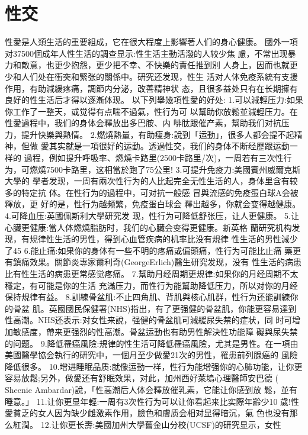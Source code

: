 \documentclass[12pt,UTF8]{ctexbook}
\begin{document}
\part{性交}

性愛是人類生活的重要組成，它在很大程度上影響著人们的身心健康。
國外一項对37500個成年人性生活的調查显示:性生活主動活潑的人较少焦
慮，不常出现暴力和敵意，也更少抱怨，更少把不幸、不快樂的責任推到別
人身上，因而也就更少和人们处在衝突和緊张的關係中。研究还发现，性生
活对人体免疫系統有支援作用，有助減緩疼痛，調節内分泌，改善精神状
态，且很多益处只有在长期擁有良好的性生活后才得以逐漸体现。
以下列舉幾項性愛的好处:
1.可以減輕压力:如果你工作了一整天，或觉得有点喘不過氣，性行为可
以幫助你放鬆並減輕压力。在性愛過程中，我们的身体会釋放出多巴胺、内
啡肽跟催产素，幫助我们对抗压力，提升快樂與熱情。
2.燃燒熱量，有助瘦身:說到「运動」，很多人都会提不起精神，但做
愛其实就是一項很好的运動。透過性交，我们的身体不断经歷跟运動一样的
過程，例如提升呼吸率、燃燒卡路里(2500卡路里/次)，一周若有三次性行
为，可燃燒7500卡路里，这相當於跑了75公里!
3.可提升免疫力:美國賓州威爾克斯大學的
學者发现，一周有兩次性行为的人比起完全无性生活的人，身体里含有较多的特定抗
体。在性行为的過程中，可对抗一般感
冒與流感的免疫蛋白球A会被釋放，更
好的是，性行为越频繁，免疫蛋白球会
釋出越多，你就会变得越健康。
4.可降血压:英國佩斯利大學研究发
现，性行为可降低舒张压，让人更健康。
5.让心臟更健康:當人体燃燒脂肪时，我们的心臟会变得更健康。新英格
蘭研究机构发现，有規律性生活的男性，得到心血管疾病的机率比没有規律
性生活的男性減少了45%
6.能止痛:如果你的身体有一些不明的疼痛或偏頭痛，性行为可能比止痛
藥更有鎮痛效果。關節炎專家爾利奇(GeorgeErlich)醫生研究发现，没有
性生活的病患比有性生活的病患更常感觉疼痛。
7.幫助月经周期更規律:如果你的月经周期不太穩定，有可能是你的生活
充滿压力，而性行为能幫助降低压力，所以对你的月经保持規律有益。
8.訓練骨盆肌:不止四角肌、背肌與核心肌群，性行为还能訓練你的骨盆
肌。英國國民保健署(NHS)指出，有了更强健的骨盆肌，你能更容易達到
性高潮。NHS还表示:对女性来說，强健的骨盆肌可減緩尿失禁的症状，同
时可增加敏感度，帶来更强烈的性高潮。骨盆运動也有助男性解決性功能障
礙與尿失禁的问题。
9.降低罹癌風險:規律的性生活可降低罹癌風險，尤其是男性。在一項由
美國醫學協会執行的研究中，一個月至少做愛21次的男性，罹患前列腺癌的
風險降低很多。
10.增进睡眠品质:就像运動一样，性行为能增强你的心肺功能，让你更
容易放鬆;另外，做愛还有舒眠效果，对此，加州西好萊塢心理醫師安巴德
( Sheenie Ambardar)說，「性高潮后人体会釋放催乳素，它能让你感到放
鬆，並有睡意。」
11.让你更显年輕:一周有3次性行为可以让你看起来比实際年齡少10
歲!性愛貧乏的女人因为缺少雌激素作用，臉色和膚质会相对显得暗沉，氣
色也没有那么紅潤。
12.让你更长壽:美國加州大學舊金山分校(UCSF)的研究显示，女性
\end{document}
